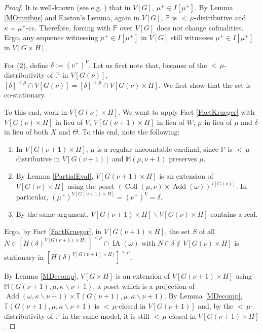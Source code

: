 \documentclass[a4paper]{amsart}
\theoremstyle{definition}
\theoremstyle{remark}
\theoremstyle{plain}
\numberwithin{mydef}{section}
\DeclareMathOperator{\Add}{Add}
\DeclareMathOperator{\Coll}{Coll}
\DeclareMathOperator{\IA}{IA}
\newcommand{\dM}{\mathbb{M}}
\newcommand{\dP}{\mathbb{P}}
\newcommand{\dT}{\mathbb{T}}
\begin{document}
	\begin{proof}
		It is well-known (see e.g. \cite{CummingsFriedmanMagidorRinotSinapovaEightfold}) that in $V[G]$, $\mu^+\in I[\mu^+]$. By Lemma \ref{MOmnibus} and Easton's Lemma, again in $V[G]$, $\dP$ is ${<}\,\mu$-distributive and $\kappa=\mu^+$-cc. Therefore, forcing with $\dP$ over $V[G]$ does not change cofinalities. Ergo, any sequence witnessing $\mu^+\in I[\mu^+]$ in $V[G]$ still witnesses $\mu^+\in I[\mu^+]$ in $V[G\times H]$.
		
		For (2), define $\delta:=(\nu^+)^V$. Let us first note that, because of the ${<}\,\mu$-distributivity of $\dP$ in $V[G(\nu)]$, $[\delta]^{<\mu}\cap V[G(\nu)]=[\delta]^{<\mu}\cap V[G(\nu)\times H]$. We first show that the set is co-stationary.
		
		To this end, work in $V[G(\nu)\times H]$. We want to apply Fact \ref{FactKrueger} with $V[G(\nu)\times H]$ in lieu of $V$, $V[G(\nu+1)\times H]$ in lieu of $W$, $\mu$ in lieu of $\mu$ and $\delta$ in lieu of both $X$ and $\Theta$. To this end, note the following:
		\begin{enumerate}
			\item In $V[G(\nu+1)\times H]$, $\mu$ is a regular uncountable cardinal, since $\dP$ is ${<}\,\mu$-distributive in $V[G(\nu+1)]$ and $\dM(\mu,\nu+1)$ preserves $\mu$.
			\item By Lemma \ref{PartialEval}, $V[G(\nu+1)\times H]$ is an extension of $V[G(\nu)\times H]$ using the poset $(\Coll(\mu,\nu)\times\Add(\omega))^{V[G(\nu)]}$. In particular, $(\mu^+)^{V[G(\nu+1)\times H]}=(\nu^+)^V=\delta$.
			\item By the same argument, $V[G(\nu+1)\times H]\smallsetminus V[G(\nu)\times H]$ contains a real.
		\end{enumerate}
		
		Ergo, by Fact \ref{FactKrueger}, in $V[G(\nu+1)\times H]$, the set $S$ of all $N\in[H(\delta)^{V[G(\nu+1)\times H]}]^{<\mu}\cap\IA(\omega)$ with $N\cap\delta\notin V[G(\nu)\times H]$ is stationary in $[H(\delta)^{V[G(\nu+1)\times H]}]^{<\mu}$.
		
		By Lemma \ref{MDecomp}, $V[G\times H]$ is an extension of $V[G(\nu+1)\times H]$ using $\dM(G(\nu+1),\mu,\kappa\smallsetminus\nu+1)$, a poset which is a projection of $\Add(\omega,\kappa\smallsetminus\nu+1)\times\dT(G(\nu+1),\mu,\kappa\smallsetminus\nu+1)$. By Lemma \ref{MDecomp}, $\dT(G(\nu+1),\mu,\kappa\smallsetminus\nu+1)$ is ${<}\,\mu$-closed in $V[G(\nu+1)]$ and, by the ${<}\,\mu$-distributivity of $\dP$ in the same model, it is still ${<}\,\mu$-closed in $V[G(\nu+1)\times H]$.
		

\end{proof}
\end{document}
